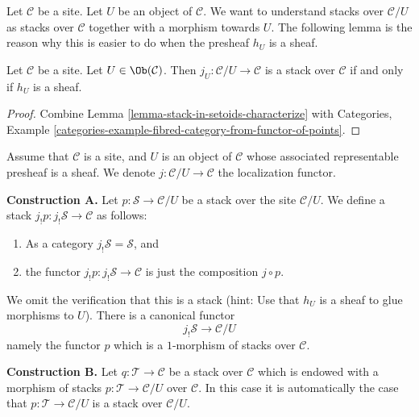 \noindent
Let $\mathcal{C}$ be a site.
Let $U$ be an object of $\mathcal{C}$.
We want to understand stacks over $\mathcal{C}/U$ as stacks
over $\mathcal{C}$ together with a morphism towards $U$.
The following lemma is the reason why this is easier to do
when the presheaf $h_U$ is a sheaf.

\begin{lemma}
\label{lemma-when-localization-stack}
Let $\mathcal{C}$ be a site. Let $U \in \Ob(\mathcal{C})$.
Then $j_U : \mathcal{C}/U \to \mathcal{C}$ is a stack over $\mathcal{C}$
if and only if $h_U$ is a sheaf.
\end{lemma}

\begin{proof}
Combine
Lemma \ref{lemma-stack-in-setoids-characterize}
with
Categories,
Example \ref{categories-example-fibred-category-from-functor-of-points}.
\end{proof}

\noindent
Assume that $\mathcal{C}$ is a site,
and $U$ is an object of $\mathcal{C}$ whose associated representable
presheaf is a sheaf. We denote $j : \mathcal{C}/U \to \mathcal{C}$
the localization functor.

\medskip\noindent
{\bf Construction A.} Let $p : \mathcal{S} \to \mathcal{C}/U$ be a stack
over the site $\mathcal{C}/U$. We define a stack
$j_!p : j_!\mathcal{S} \to \mathcal{C}$ as follows:
\begin{enumerate}
\item As a category $j_!\mathcal{S} = \mathcal{S}$, and
\item the functor $j_!p : j_!\mathcal{S} \to \mathcal{C}$
is just the composition $j \circ p$.
\end{enumerate}
We omit the verification that this is a stack (hint: Use that
$h_U$ is a sheaf to glue morphisms to $U$). There is a canonical
functor
$$
j_!\mathcal{S} \longrightarrow \mathcal{C}/U
$$
namely the functor $p$ which is a $1$-morphism of stacks over $\mathcal{C}$.

\medskip\noindent
{\bf Construction B.}
Let $q : \mathcal{T} \to \mathcal{C}$ be a stack over $\mathcal{C}$
which is endowed with a morphism of stacks $p : \mathcal{T} \to \mathcal{C}/U$
over $\mathcal{C}$. In this case it is automatically the case that
$p : \mathcal{T} \to \mathcal{C}/U$ is a stack over $\mathcal{C}/U$.


